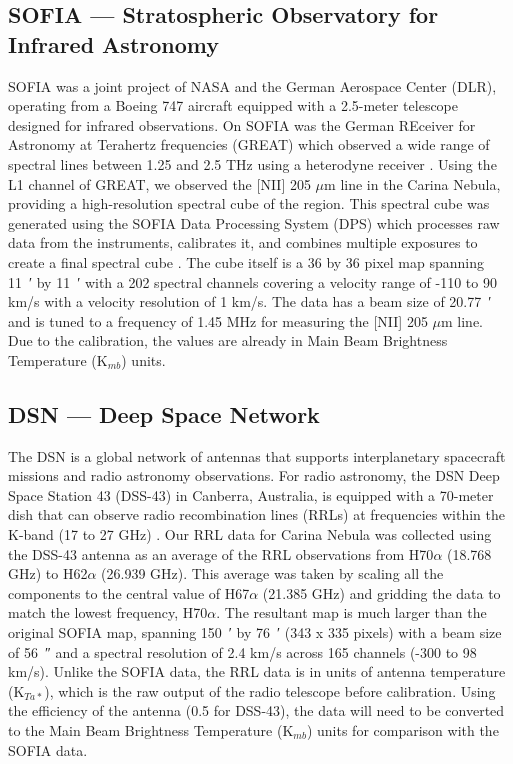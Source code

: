\subsection{SOFIA --- Stratospheric Observatory for Infrared Astronomy}
SOFIA was a joint project of NASA and the German Aerospace Center (DLR), operating from a Boeing 747 aircraft equipped with a 2.5-meter telescope designed for infrared observations.
On SOFIA was the German REceiver for Astronomy at Terahertz frequencies (GREAT) which observed a wide range of spectral lines between 1.25 and 2.5 THz using a heterodyne receiver \parencite{heyminck2012great}.
Using the L1 channel of GREAT, we observed the [NII] 205 $\mu$m line in the Carina Nebula, providing a high-resolution spectral cube of the region.
This spectral cube was generated using the SOFIA Data Processing System (DPS) which processes raw data from the instruments, calibrates it, and combines multiple exposures to create a final spectral cube \parencite{shuping2014overview}.
The cube itself is a 36 by 36 pixel map spanning \qty{11}{\arcminute} by \qty{11}{\arcminute} with a 202 spectral channels covering a velocity range of -110 to 90 km/s with a velocity resolution of 1 km/s.
The data has a beam size of \qty{20.77}{\arcminute}  and is tuned to a frequency of 1.45 MHz for measuring the [NII] 205 $\mu$m line.
Due to the calibration, the values are already in Main Beam Brightness Temperature (K$_{mb}$) units.

\subsection{DSN --- Deep Space Network}
The DSN is a global network of antennas that supports interplanetary spacecraft missions and radio astronomy observations.
For radio astronomy, the DSN Deep Space Station 43 (DSS-43) in Canberra, Australia, is equipped with a 70-meter dish that can observe radio recombination lines (RRLs) at frequencies within the K-band (17 to 27 GHz) \parencite{virkler2020broadband}.
Our RRL data for Carina Nebula was collected using the DSS-43 antenna as an average of the RRL observations from H70$\alpha$ (18.768 GHz) to H62$\alpha$ (26.939 GHz).
This average was taken by scaling all the components to the central value of H67$\alpha$ (21.385 GHz) and gridding the data to match the lowest frequency, H70$\alpha$.
The resultant map is much larger than the original SOFIA map, spanning \qty{150}{\arcminute} by \qty{76}{\arcminute} (343 x 335 pixels) with a beam size of \qty{56}{\arcsecond} and a spectral resolution of 2.4 km/s across 165 channels (-300 to 98 km/s).
Unlike the SOFIA data, the RRL data is in units of antenna temperature (K$_{Ta*}$), which is the raw output of the radio telescope before calibration.
Using the efficiency of the antenna (0.5 for DSS-43), the data will need to be converted to the Main Beam Brightness Temperature (K$_{mb}$) units for comparison with the SOFIA data.

